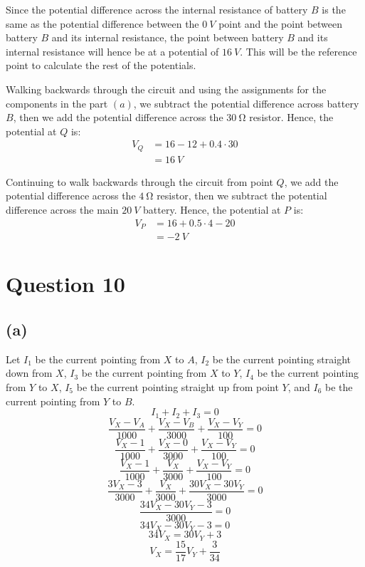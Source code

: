 \documentclass[11pt]{article}
\begin{document}
Since the potential difference across the internal resistance of battery \(B\) is the same as the potential difference between the \(\qty{0}{\unit{V}}\) point and the point between battery \(B\) and its internal resistance, the point between battery \(B\) and its internal resistance will hence be at a potential of \(\qty{16}{\unit{V}}\). This will be the reference point to calculate the rest of the potentials.


Walking backwards through the circuit and using the assignments for the components in the part \((a)\), we subtract the potential difference across battery \(B\), then we add the potential difference across the \(\qty{30}{\unit{\ohm}}\) resistor. Hence, the potential at \(Q\) is:
\begin{align*}
V_Q &= 16 - 12 + 0.4 \cdot 30 \\
&= \qty{16}{\unit{V}}
\end{align*}

Continuing to walk backwards through the circuit from point \(Q\), we add the potential difference across the \(\qty{4}{\unit{\ohm}}\) resistor, then we subtract the potential difference across the main \(\qty{20}{\unit{V}}\) battery. Hence, the potential at \(P\) is:
\begin{align*}
V_P &= 16 + 0.5 \cdot 4 - 20 \\
&= \qty{-2}{\unit{V}}
\end{align*}
\section{Question 10}
\label{sec:org5aa10ee}

\subsection{(a)}
\label{sec:orga14d9dc}
Let \(I_1\) be the current pointing from \(X\) to \(A\), \(I_2\) be the current pointing straight down from \(X\), \(I_3\) be the current pointing from \(X\) to \(Y\), \(I_4\) be the current pointing from \(Y\) to \(X\), \(I_5\) be the current pointing straight up from point \(Y\), and \(I_6\) be the current pointing from \(Y\) to \(B\).
\[I_1 + I_2 + I_3 = 0\]
\[\frac{V_X - V_A}{1000} + \frac{V_X - V_B}{3000} + \frac{V_X - V_Y}{100} = 0\]
\[\frac{V_X - 1}{1000} + \frac{V_X - 0}{3000} + \frac{V_X - V_Y}{100} = 0\]
\[\frac{V_X - 1}{1000} + \frac{V_X}{3000} + \frac{V_X - V_Y}{100} = 0\]
\[\frac{3V_X - 3}{3000} + \frac{V_X}{3000} + \frac{30V_X - 30V_Y}{3000} = 0\]
\[\frac{34V_X - 30V_Y - 3}{3000} = 0\]
\[34V_X - 30V_Y - 3 = 0\]
\[34V_X = 30V_Y + 3\]
\[V_X = \frac{15}{17}V_Y + \frac{3}{34} \tag{1}\]
\end{document}
